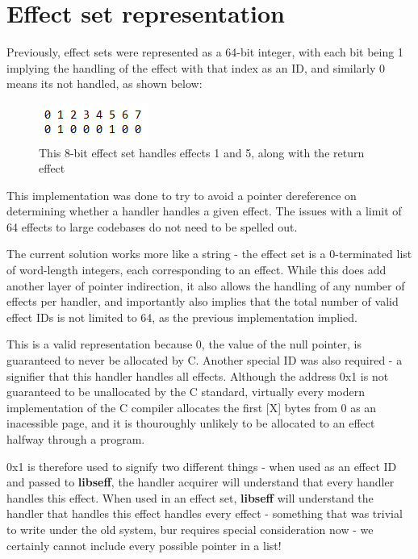 \documentclass[logo,bsc,singlespacing,parskip,online]{infthesis}
\begin{document}
\section{Effect set representation}

Previously, effect sets were represented as a 64-bit integer, with each bit being 1 implying the handling of the effect with that index as an ID, and similarly 0 means its not handled, as shown below: 

\begin{figure}[h]
    \centering
    \includegraphics[width=0.3\linewidth]{effect_set.png}
    \caption{This 8-bit effect set handles effects 1 and 5, along with the return effect}
\end{figure}

This implementation was done to try to avoid a pointer dereference on determining whether a handler handles a given effect. The issues with a limit of 64 effects to large codebases do not need to be spelled out.

The current solution works more like a string - the effect set is a 0-terminated list of word-length integers, each corresponding to an effect. While this does add another layer of pointer indirection, it also allows the handling of any number of effects per handler, and importantly also implies that the total number of valid effect IDs is not limited to 64, as the previous implementation implied.

This is a valid representation because 0, the value of the null pointer, is guaranteed to never be allocated by C. Another special ID was also required - a signifier that this handler handles all effects. Although the address 0x1 is not guaranteed to be unallocated by the C standard, virtually every modern implementation of the C compiler allocates the first [X] bytes from 0 as an inacessible page, and it is thouroughly unlikely to be allocated to an effect halfway through a program.

0x1 is therefore used to signify two different things - when used as an effect ID and passed to \textbf{libseff}, the handler acquirer will understand that every handler handles this effect. When used in an effect set, \textbf{libseff} will understand the handler that handles this effect handles every effect - something that was trivial to write under the old system, bur requires special consideration now - we certainly cannot include every possible pointer in a list!
\end{document}
